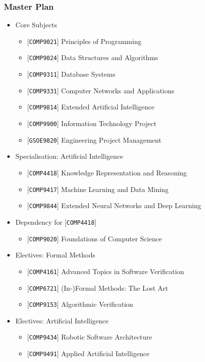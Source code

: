 \documentclass[12pt,a4paper,oneside]{article}
\begin{document}
\subsubsection{Master Plan}
\begin{itemize}
	\item Core Subjects
		\begin{itemize}
			\item $[$\texttt{COMP9021}$]$ Principles of Programming
			\item $[$\texttt{COMP9024}$]$ Data Structures and Algorithms
			\item $[$\texttt{COMP9311}$]$ Database Systems
			\item $[$\texttt{COMP9331}$]$ Computer Networks and Applications
			\item $[$\texttt{COMP9814}$]$ Extended Artificial Intelligence
			\item $[$\texttt{COMP9900}$]$ Information Technology Project
			\item $[$\texttt{GSOE9820}$]$ Engineering Project Management
		\end{itemize}
	\item Specialisation: Artificial Intelligence
		\begin{itemize}
			\item $[$\texttt{COMP4418}$]$ Knowledge Representation and Reasoning
			\item $[$\texttt{COMP9417}$]$ Machine Learning and Data Mining
			\item $[$\texttt{COMP9844}$]$ Extended Neural Networks and Deep Learning
		\end{itemize}
	\item Dependency for $[$\texttt{COMP4418}$]$
		\begin{itemize}
			\item $[$\texttt{COMP9020}$]$ Foundations of Computer Science
		\end{itemize}
	\item Electives: Formal Methods
		\begin{itemize}
			\item $[$\texttt{COMP4161}$]$ Advanced Topics in Software Verification
			\item $[$\texttt{COMP6721}$]$ (In-)Formal Methods: The Lost Art
			\item $[$\texttt{COMP9153}$]$ Algorithmic Verification
		\end{itemize}
	\item Electives: Artificial Intelligence
		\begin{itemize}
			\item $[$\texttt{COMP9434}$]$ Robotic Software Architecture
			\item $[$\texttt{COMP9491}$]$ Applied Artificial Intelligence
		\end{itemize}
\end{itemize}
\end{document}
